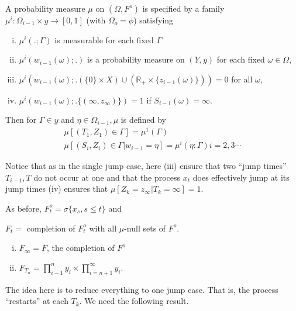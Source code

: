 A probability measure $\mu$ on $(\Omega, F^o)$ is specified by a
family $\mu ^i : \Omega_{i-1} \times y \rightarrow [0,1]$ (with $\Omega_o
= \phi$) satisfying  
\begin{enumerate}[(i)]
\item $\mu ^i (.; \Gamma)$ is measurable for each fixed $\Gamma$
 
\item $\mu^i (w_{i-1}(\omega);.) $ is a probability measure on $(Y,
  y)$ for each fixed $\omega \in  \Omega$, 

\item $\mu^i (w_{i-1}(\omega);.(\{0\} \times X) \cup (\mathbb{R_+} \times
  \{ z_{i-1}(\omega)\})) = 0 $ for all $\omega$,\pageoriginale 

\item $\mu^i (w_{i-1}(\omega);.\{ (\infty, z_\infty)\}) = 1$ if
  $S_{i-1}(\omega) = \infty$. 
\end{enumerate}

Then for $\Gamma \in  y$ and $\eta \in  \Omega_{i-1}, \mu$
is defined by  
\begin{gather*}
  \mu [(T_1, Z_1) \in  \Gamma ] = \mu ^1(\Gamma) \\
  \mu [(S_i, Z_i) \in  \Gamma | w_{i-1} = \eta] = \mu^i (\eta :
  \Gamma) i = 2,3\cdots 
\end{gather*}

Notice that as in the single jump case, here (iii) ensure that two
``jump times'' $T_{i-1}, T$ do not occur at one and that the process
$x_t$ does effectively jump at its jump times (iv) ensures that $\mu
[Z_k = z_\infty | T_k = \infty] = 1$. 

As before, $F^{o}_{t} = \sigma \{ x_s, s \le t \}$ and 

$F_t =$ completion of $F^{o}_{t}$ with all $\mu$-null sets of $F^o$.

\begin{prop}%
  \begin{enumerate}[(i)]
  \item $F_\infty = F$, the completion of $F^o$

  \item $F_{T_n} = \prod \limits^n_{i-1} y_i \times \prod
    \limits^\infty_{i=n+1} y_i $. 
  \end{enumerate}
\end{prop}

The idea here is to reduce everything to one jump case. That is, the
process ``restarts'' at each $T_k$. We need the following result. 

